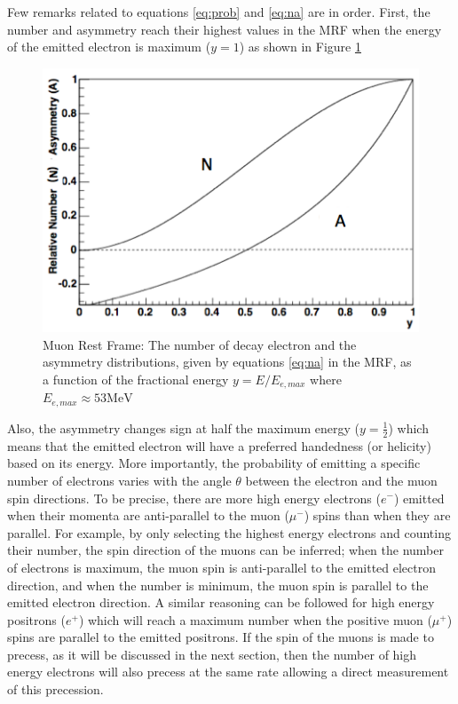 \documentclass{outhesis}
\begin{document}
Few remarks related to equations \ref{eq:prob} and \ref{eq:na} are in order. First, the number and asymmetry reach their highest values in the MRF when the energy of the emitted electron is maximum ($y=1$) as shown in Figure \ref{fig:CMF}
 \begin{figure}
    \centering
  \includegraphics[scale=0.5]{figures/CMF}
   \caption{Muon Rest Frame: The number of decay electron and the asymmetry distributions, given by equations \ref{eq:na} in the MRF, as a function of the fractional energy $y=E/E_{e,max}$ where $E_{e,max} \approx 53 \text{MeV}$ \cite{bnl}}
  \label{fig:CMF}
\end{figure}
Also, the asymmetry changes sign at half the maximum energy ($y=\frac{1}{2}$) which means that the emitted electron will have a preferred handedness (or helicity) based on its energy. More importantly, the probability of emitting a specific number of electrons varies with the angle $\theta$ between the electron and the muon spin directions. To be precise, there are more high energy electrons ($e^-$) emitted when their momenta are anti-parallel to the muon ($\mu^-$) spins than when they are parallel. For example, by only selecting the highest energy electrons and counting their number, the spin direction of the muons can be inferred; when the number of electrons is maximum, the muon spin is anti-parallel to the emitted electron direction, and when the number is minimum, the muon spin is parallel to the emitted electron direction. A similar reasoning can be followed for high energy positrons ($e^+$) which will reach a maximum number when the positive muon ($\mu^+$) spins are parallel to the emitted positrons. If the spin of the muons is made to precess, as it will be discussed in the next section, then the number of high energy electrons will also precess at the same rate allowing a direct measurement of this precession. 
\end{document}
